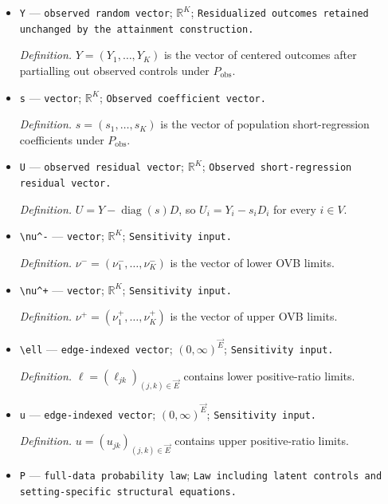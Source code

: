 \documentclass{article}
\begin{document}
\begin{itemize}
  \item \texttt{Y} --- \texttt{observed random vector}; \(\mathbb R^K\); \texttt{Residualized outcomes retained unchanged by the attainment construction.}
  \par\smallskip\noindent\emph{Definition.} \(Y=(Y_1,\ldots,Y_K)\) is the vector of centered outcomes after partialling out observed controls under \(P_{\mathrm{obs}}\).
  \item \texttt{s} --- \texttt{vector}; \(\mathbb R^K\); \texttt{Observed coefficient vector.}
  \par\smallskip\noindent\emph{Definition.} \(s=(s_1,\ldots,s_K)\) is the vector of population short-regression coefficients under \(P_{\mathrm{obs}}\).
  \item \texttt{U} --- \texttt{observed residual vector}; \(\mathbb R^K\); \texttt{Observed short-\allowbreak{}regression residual vector.}
  \par\smallskip\noindent\emph{Definition.} \(U=Y-\operatorname{diag}(s)D\), so \(U_i=Y_i-s_iD_i\) for every \(i\in V\).
  \item \texttt{\textbackslash{}\allowbreak{}nu\textasciicircum{}-\allowbreak{}} --- \texttt{vector}; \(\mathbb R^K\); \texttt{Sensitivity input.}
  \par\smallskip\noindent\emph{Definition.} \(\nu^-=(\nu^-_1,\ldots,\nu^-_K)\) is the vector of lower OVB limits.
  \item \texttt{\textbackslash{}\allowbreak{}nu\textasciicircum{}+\allowbreak{}} --- \texttt{vector}; \(\mathbb R^K\); \texttt{Sensitivity input.}
  \par\smallskip\noindent\emph{Definition.} \(\nu^+=(\nu^+_1,\ldots,\nu^+_K)\) is the vector of upper OVB limits.
  \item \texttt{\textbackslash{}\allowbreak{}ell} --- \texttt{edge-\allowbreak{}indexed vector}; \((0,\infty)^{\vec E}\); \texttt{Sensitivity input.}
  \par\smallskip\noindent\emph{Definition.} \(\ell=(\ell_{jk})_{(j,k)\in\vec E}\) contains lower positive-ratio limits.
  \item \texttt{u} --- \texttt{edge-\allowbreak{}indexed vector}; \((0,\infty)^{\vec E}\); \texttt{Sensitivity input.}
  \par\smallskip\noindent\emph{Definition.} \(u=(u_{jk})_{(j,k)\in\vec E}\) contains upper positive-ratio limits.
  \item \texttt{P} --- \texttt{full-\allowbreak{}data probability law}; \texttt{Law including latent controls and setting-\allowbreak{}specific structural equations.}

\end{itemize}
\end{document}

